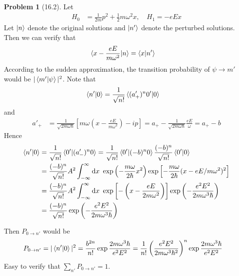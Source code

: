 \documentclass[twoside,11pt]{article}
\renewcommand*\d{\mathop{}\!\mathrm{d}}
\theoremstyle{definition}
\newtheorem{problem}{Problem}
\theoremstyle{remark}
\begin{document}
\begin{problem}[16.2]
Let 
\begin{align*}
    H_0 &= \frac{1}{2m}p^2 + \frac{1}{2}m\omega^2 x,\quad
    H_1 = -eEx
\end{align*}
Let $\ket{n}$ denote the original solutions
and $\ket{n'}$ denote the perturbed solutions.
Then we can verify that
\begin{align*}
    \braket{x-\frac{eE}{m\omega^2}|n} &= 
    \braket{x|n'}
\end{align*}
According to the sudden approximation, the transition probability
of $\psi\rightarrow m'$ would be $|\braket{m'|\psi}|^2$.
Note that
\begin{align*}
    \braket{n'|0} &= 
    \frac{1}{\sqrt{n!}}\braket{(a'_+)^n 0'|0}
\end{align*}
and
\begin{align*}
    a'_+ &= \frac{1}{\sqrt{2m\omega\hbar}}
    \left[m\omega\left(x - \frac{eE}{m\omega^2}\right) - ip\right]
    = a_+ - \frac{1}{\sqrt{2m\omega\hbar}}\frac{eE}{\omega}
    = a_+ - b
\end{align*}
Hence
\begin{align*}
    \braket{n'|0} &= \frac{1}{\sqrt{n!}}\braket{0'|(a'_-)^n0}
    = \frac{1}{\sqrt{n!}}\braket{0'|(-b)^n 0}
    \frac{(-b)^n}{\sqrt{n!}}\braket{0'|0}\\
    &= 
    \frac{(-b)^n}{\sqrt{n!}}A^2
    \int_{-\infty}^\infty\d x\
    \exp\left(-\frac{m\omega}{2\hbar}x^2\right)
    \exp\left[-\frac{m\omega}{2\hbar}(x-eE/m\omega^2)^2\right]\\
    &= \frac{(-b)^n}{\sqrt{n!}}A^2
    \int_{-\infty}^\infty\d x\
    \exp\left[-\left(x-\frac{eE}{2m\omega^2}\right)\right]
    \exp\left(-\frac{e^2E^2}{2m\omega^3 \hbar} \right)\\
    &= \frac{(-b)^n}{\sqrt{n!}}
    \exp\left(-\frac{e^2E^2}{2m\omega^3 \hbar} \right)
\end{align*}

Then $P_{0\rightarrow n'}$ would be
\begin{align*}
    P_{0\rightarrow n'} &= |\braket{n'|0}|^2
    = \frac{b^{2n}}{n!}\exp\frac{2m\omega^3\hbar}{e^2E^2}
    = \frac{1}{n!}\left(\frac{e^2E^2}{2m\omega^3\hbar^2}\right)^n\exp\frac{2m\omega^3\hbar}{e^2E^2}
\end{align*}
Easy to verify that $\sum_{n'} P_{0\rightarrow n'}=1$.

\end{problem}



\end{document}

